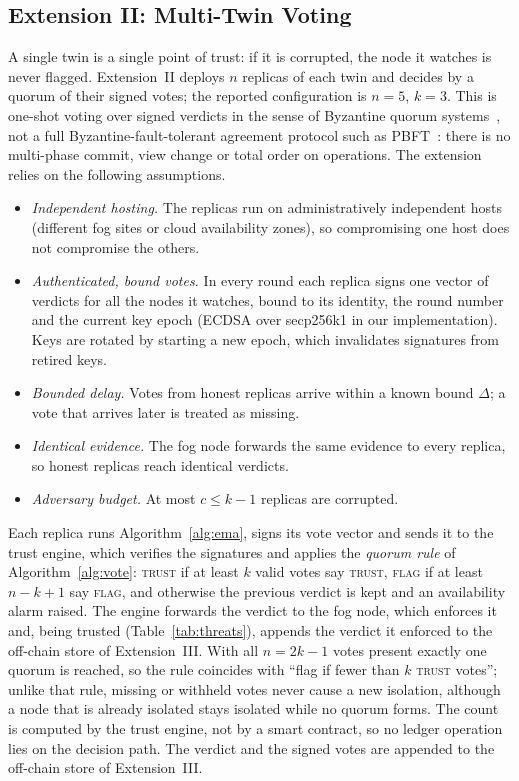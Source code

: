 \documentclass{ieeeaccess}
\begin{document}
\subsection{Extension II: Multi-Twin Voting}
\label{sec:ext2}
A single twin is a single point of trust: if it is corrupted, the
node it watches is never flagged.  Extension~II deploys $n$ replicas
of each twin and decides by a quorum of their signed votes; the
reported configuration is $n=5$, $k=3$.  This is one-shot voting over
signed verdicts in the sense of Byzantine quorum
systems~\cite{malkhi1998byzantine}, not a full Byzantine-fault-tolerant
agreement protocol such as PBFT~\cite{castro2002practical}: there is no
multi-phase commit, view change or total order on operations.  The
extension relies on the following assumptions.
\begin{itemize}
\item[(B1)] \emph{Independent hosting.}  The replicas run on
administratively independent hosts (different fog sites or cloud
availability zones), so compromising one host does not compromise the
others.
\item[(B2)] \emph{Authenticated, bound votes.}  In every round each
replica signs one vector of verdicts for all the nodes it watches,
bound to its identity, the round number and the current key epoch
(ECDSA over secp256k1 in our implementation).  Keys are rotated by
starting a new epoch, which invalidates signatures from retired keys.
\item[(B3)] \emph{Bounded delay.}  Votes from honest replicas arrive
within a known bound $\Delta$; a vote that arrives later is treated as
missing.
\item[(B4)] \emph{Identical evidence.}  The fog node forwards the same
evidence to every replica, so honest replicas reach identical
verdicts.
\item[(B5)] \emph{Adversary budget.}  At most $c\le k-1$ replicas are
corrupted.
\end{itemize}
Each replica runs Algorithm~\ref{alg:ema}, signs its vote vector and
sends it to the trust engine, which verifies the signatures and
applies the \emph{quorum rule} of Algorithm~\ref{alg:vote}:
\textsc{trust} if at least $k$ valid votes say \textsc{trust},
\textsc{flag} if at least $n-k+1$ say \textsc{flag}, and otherwise the
previous verdict is kept and an availability alarm raised.
The engine forwards the verdict to the fog node, which enforces it
and, being trusted (Table~\ref{tab:threats}), appends the verdict it
enforced to the off-chain store of Extension~III.  With all
$n=2k-1$ votes present exactly one quorum is reached, so the rule
coincides with ``flag if fewer than $k$ \textsc{trust} votes''; unlike
that rule, missing or withheld votes never cause a new isolation,
although a node that is already isolated stays isolated while no
quorum forms.  The count is computed by the trust engine, not by a smart
contract, so no ledger operation lies on the decision path.  The
verdict and the signed votes are appended to the off-chain store of
Extension~III.
\end{document}

